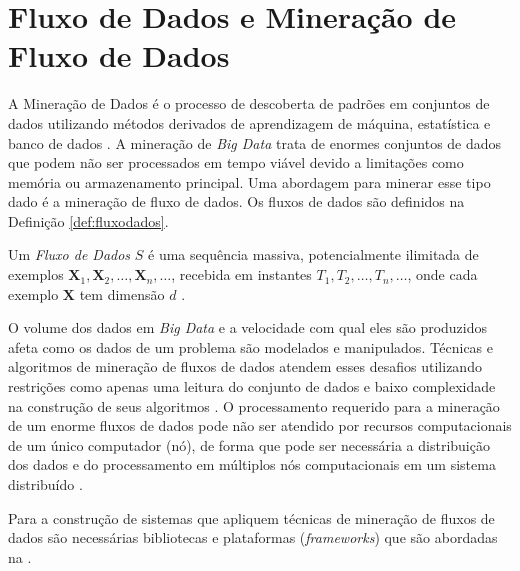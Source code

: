 
\section{Fluxo de Dados e Mineração de Fluxo de Dados}

A Mineração de Dados é o processo de descoberta de padrões em conjuntos de dados
utilizando métodos derivados de aprendizagem de máquina, estatística e banco de
dados \cite{Gaber2005}. A mineração de \emph{Big Data} trata de enormes
conjuntos de dados que podem não ser processados em tempo viável devido a
limitações como memória ou armazenamento principal. Uma abordagem para minerar
esse tipo dado é a mineração de fluxo de dados. Os fluxos de dados são definidos
na Definição \ref{def:fluxodados}.

\begin{definition}
  Um \textit{Fluxo de Dados} $S$ é uma sequência massiva, potencialmente
  ilimitada de exemplos $\mathbf{X}_1, \mathbf{X}_2, \dots, \mathbf{X}_n, \dots$,
  recebida em instantes $T_1, T_2, \dots, T_n, \dots$,
  onde cada exemplo $\mathbf{X}$ tem dimensão $d$
  \cite{Aggarwal2003}.
  \label{def:fluxodados}
\end{definition}

O volume dos dados em \emph{Big Data} e a velocidade com qual eles são
produzidos afeta como os dados de um problema são modelados e manipulados.
Técnicas e algoritmos de mineração de fluxos de dados atendem esses desafios
utilizando restrições como apenas uma leitura do conjunto de dados e baixo
complexidade na construção de seus algoritmos \cite{Gama2007, Gaber2005}. O
processamento requerido para a mineração de um enorme fluxos de dados pode não
ser atendido por recursos computacionais de um único computador (nó), de forma
que pode ser necessária a distribuição dos dados e do processamento em múltiplos nós computacionais
em um sistema distribuído \cite{Gaber2005}.


Para a construção de sistemas que apliquem técnicas de mineração de fluxos de
dados são necessárias bibliotecas e plataformas (\emph{frameworks})
que são abordadas na .


